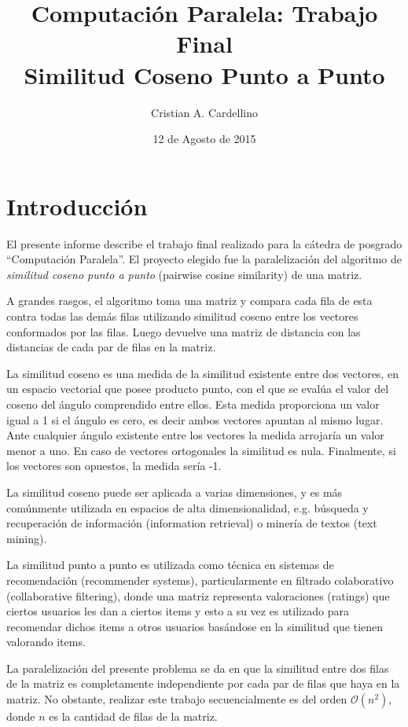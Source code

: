 \documentclass[11pt, a4paper]{article}
\title{
    \large{Computación Paralela: Trabajo Final}\\
    \huge{Similitud Coseno Punto a Punto}
}
\author{Cristian A. Cardellino}
\date{12 de Agosto de 2015}
\begin{document}
  \maketitle

  \section{Introducción}

  El presente informe describe el trabajo final realizado para la cátedra de
  posgrado ``Computación Paralela''. El proyecto elegido fue la paralelización
  del algoritmo de {\em similitud coseno punto a punto} (pairwise cosine
  similarity) de una matriz.
  
  A grandes rasgos, el algoritmo toma una matriz y compara cada fila de esta
  contra todas las demás filas utilizando similitud coseno entre los vectores
  conformados por las filas. Luego devuelve una matriz de distancia con las
  distancias de cada par de filas en la matriz.

  La similitud coseno es una medida de la similitud existente entre dos
  vectores, en un espacio vectorial que posee producto punto, con el que se
  evalúa el valor del coseno del ángulo comprendido entre ellos. Esta medida
  proporciona un valor igual a 1 si el ángulo es cero, es decir ambos vectores
  apuntan al mismo lugar. Ante cualquier ángulo existente entre los vectores la
  medida arrojaría un valor menor a uno. En caso de vectores ortogonales la
  similitud es nula. Finalmente, si los vectores son opuestos, la medida sería
  -1.

  La similitud coseno puede ser aplicada a varias dimensiones, y es más
  comúnmente utilizada en espacios de alta dimensionalidad, e.g. búsqueda y
  recuperación de información (information retrieval) o minería de textos (text
  mining). 

  La similitud punto a punto es utilizada como técnica en sistemas de
  recomendación (recommender systems), particularmente en filtrado colaborativo
  (collaborative filtering), donde una matriz representa valoraciones
  (ratings) que ciertos usuarios les dan a ciertos items y esto a su vez es
  utilizado para recomendar dichos items a otros usuarios basándose en la
  similitud que tienen valorando items.

  La paralelización del presente problema se da en que la similitud entre dos
  filas de la matriz es completamente independiente por cada par de filas que
  haya en la matriz. No obstante, realizar este trabajo secuencialmente es del
  orden $\mathcal{O}(n^{2})$, donde $n$ es la cantidad de filas de la matriz.
\end{document}
